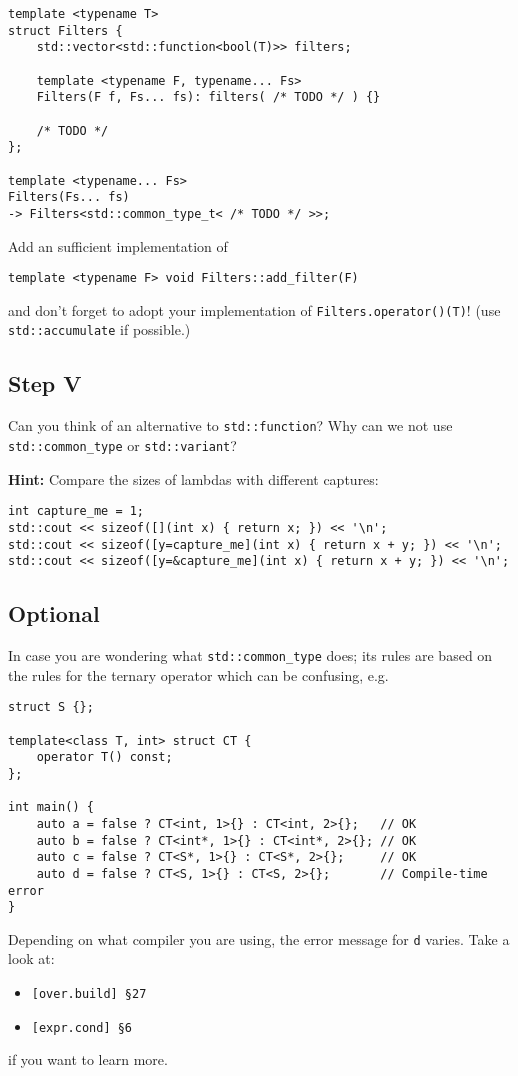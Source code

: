 \documentclass{scrartcl}
\begin{document}
\begin{lstlisting}
template <typename T>
struct Filters {
    std::vector<std::function<bool(T)>> filters;

    template <typename F, typename... Fs>
    Filters(F f, Fs... fs): filters( /* TODO */ ) {}
    
    /* TODO */
};

template <typename... Fs>
Filters(Fs... fs)
-> Filters<std::common_type_t< /* TODO */ >>;
\end{lstlisting}
Add an sufficient implementation of
\begin{lstlisting}
template <typename F> void Filters::add_filter(F)
\end{lstlisting}
and don't forget to adopt your implementation of \texttt{Filters.operator()(T)}! (use \texttt{std::accumulate} if possible.)

\subsection{Step V}
Can you think of an alternative to \texttt{std::function}? Why can we not use \texttt{std::common\_type} or \texttt{std::variant}?

\textbf{Hint:} Compare the sizes of lambdas with different captures:
\begin{lstlisting}[title=\href{https://godbolt.org/z/ZBUfgY}{\texttt{godbolt.org/z/ZBUfgY}}]
int capture_me = 1;
std::cout << sizeof([](int x) { return x; }) << '\n';
std::cout << sizeof([y=capture_me](int x) { return x + y; }) << '\n';
std::cout << sizeof([y=&capture_me](int x) { return x + y; }) << '\n';
\end{lstlisting}

\subsection{Optional}
In case you are wondering what \texttt{std::common\_type} does; its rules are based on the rules for the ternary operator which can be confusing, e.g.
\begin{lstlisting}[title=\href{https://godbolt.org/z/4TGmK6}{\texttt{godbolt.org/z/4TGmK6}}]
struct S {};

template<class T, int> struct CT {
    operator T() const;
};

int main() {
    auto a = false ? CT<int, 1>{} : CT<int, 2>{};   // OK
    auto b = false ? CT<int*, 1>{} : CT<int*, 2>{}; // OK
    auto c = false ? CT<S*, 1>{} : CT<S*, 2>{};     // OK
    auto d = false ? CT<S, 1>{} : CT<S, 2>{};       // Compile-time error
}
\end{lstlisting}
Depending on what compiler you are using, the error message for \texttt{d} varies. Take a look at:
\begin{itemize}
    \item \texttt{[over.build] \S27}
    \item \texttt{[expr.cond] \S6}
\end{itemize}
if you want to learn more.
\end{document}
